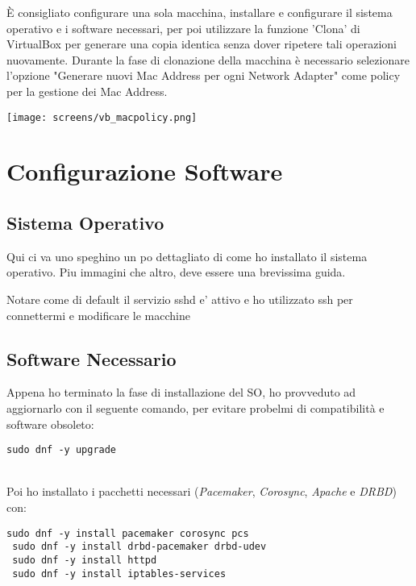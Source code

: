 \`{E} consigliato configurare una sola macchina, installare e configurare il sistema operativo e i software necessari, per poi utilizzare la funzione 'Clona' di VirtualBox per generare una copia identica senza dover ripetere tali operazioni nuovamente. Durante la fase di clonazione della macchina \`{e} necessario selezionare l'opzione "Generare nuovi Mac Address per ogni Network Adapter" come policy per la gestione dei Mac Address.

\begin{center}
	\texttt{[image: screens/vb\_macpolicy.png]}
\end{center}
 
\section{Configurazione Software}


\subsection{Sistema Operativo}

Qui ci va uno speghino un po dettagliato di come ho installato il sistema operativo. Piu immagini che altro, deve essere una brevissima guida.

Notare come di default il servizio sshd e' attivo e ho utilizzato ssh per connettermi e modificare le macchine

\subsection{Software Necessario}

Appena ho terminato la fase di installazione del SO, ho provveduto ad aggiornarlo con il seguente comando, per evitare probelmi di compatibilit\`{a} e software obsoleto:

\begin{lstlisting}[style=cmd]
 sudo dnf -y upgrade
\end{lstlisting} 
\ \\
Poi ho installato i pacchetti necessari (\textit{Pacemaker}, \textit{Corosync}, \textit{Apache} e \textit{DRBD}) con: 

\begin{lstlisting}[style=cmd]
 sudo dnf -y install pacemaker corosync pcs
 sudo dnf -y install drbd-pacemaker drbd-udev
 sudo dnf -y install httpd
 sudo dnf -y install iptables-services
\end{lstlisting} 

